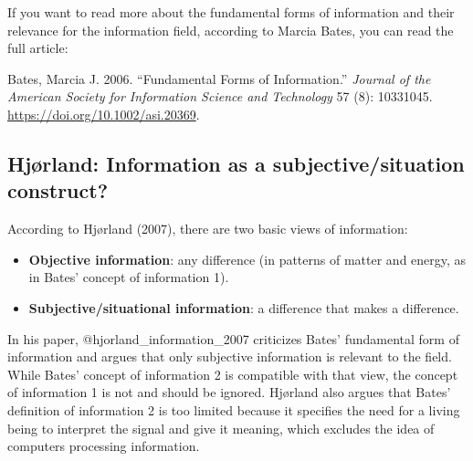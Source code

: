 \documentclass[
  letterpaper,
  DIV=11,
  numbers=noendperiod]{scrreprt}
\begin{document}
\begin{tcolorbox}[enhanced jigsaw, arc=.35mm, bottomrule=.15mm, bottomtitle=1mm, breakable, colback=white, colbacktitle=quarto-callout-note-color!10!white, colframe=quarto-callout-note-color-frame, coltitle=black, left=2mm, leftrule=.75mm, opacityback=0, opacitybacktitle=0.6, rightrule=.15mm, title=\textcolor{quarto-callout-note-color}{\faInfo}\hspace{0.5em}{Suggested reading}, titlerule=0mm, toprule=.15mm, toptitle=1mm]

If you want to read more about the fundamental forms of information and
their relevance for the information field, according to Marcia Bates,
you can read the full article:

Bates, Marcia J. 2006. ``Fundamental Forms of Information.''
\emph{Journal of the American Society for Information Science and
Technology} 57 (8): 10331045. \url{https://doi.org/10.1002/asi.20369}.

\end{tcolorbox}

\subsection{Hjørland: Information as a subjective/situation
construct?}\label{hjuxf8rland-information-as-a-subjectivesituation-construct}

According to Hjørland (2007), there are two basic views of information:

\begin{itemize}
\item
  \textbf{Objective information}: any difference (in patterns of matter
  and energy, as in Bates' concept of information 1).
\item
  \textbf{Subjective/situational information}: a difference that makes a
  difference.
\end{itemize}

In his paper, @hjorland\_information\_2007 criticizes Bates' fundamental
form of information and argues that only subjective information is
relevant to the field. While Bates' concept of information 2 is
compatible with that view, the concept of information 1 is not and
should be ignored. Hjørland also argues that Bates' definition of
information 2 is too limited because it specifies the need for a living
being to interpret the signal and give it meaning, which excludes the
idea of computers processing information.
\end{document}
